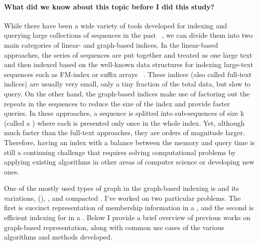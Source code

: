 \paragraph*{What did we know about this topic before I did this study?}
While there have been a wide variety of tools developed
for indexing and querying large collections of sequences in the past
~\citep{li2008mapping,langmead2009ultrafast,li2009fast,hach2010mrsfast,langmead2012fast,li2013aligning,liao2013subread,dobin2013star,kim2015hisat},
we can divide them into two main categories of linear- and graph-based indices.
In the linear-based approaches, the series of sequences are put together and treated as one large text
and then indexed based on the well-known data structures for indexing large-text sequences
such as FM-index or suffix arrays
~\citep{langmead2009ultrafast,li2009fast,langmead2012fast,li2013aligning,dobin2013star,kim2015hisat}.
These indices (also called full-text indices) are usually very small, only a tiny fraction of the total data,
but slow to query.
On the other hand, the graph-based indices make use of factoring out the repeats in the sequences
to reduce the size of the index and provide faster queries.
In these approaches, a sequence is
splitted into sub-sequences of size k (called a \kmer) where each \kmer is presented only once
in the whole index.
Yet, although much faster than the full-text approaches, they are orders of magnitude larger.
Therefore, having an index with a balance between the memory and query time
is still a continuing challenge that requires solving computational problems by applying
existing algorithms in other areas of computer science or developing new ones.

One of the mostly used types of graph in the graph-based indexing is \dbg
and its variations, \longcdbg (\cdbg), \compdbg, and compacted \longcdbg.
I’ve worked on two particular problems. The first is succinct representation of membership information
in a \longcdbg, and the second is efficient indexing for \kmers
in a \compdbg.
Below I provide a brief overview of previous works on graph-based representation,
along with common use cases of the various algorithms and methods developed.

